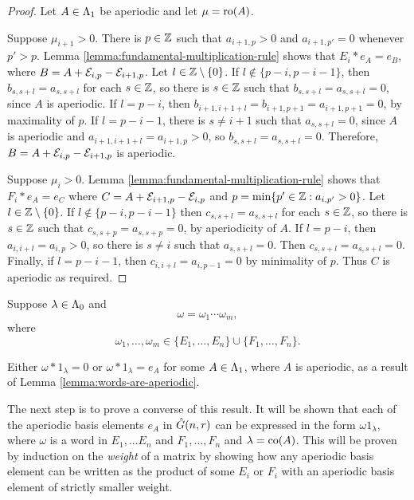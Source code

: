 \documentclass[a4paper, 11pt]{report}
\begin{document}
\begin{proof}
Let $A\in\Lambda_1{}$ be aperiodic and let $\mu=\operatorname{ro}(A)$.

Suppose $\mu_{i+1}>0$. There is $p\in\mathbb{Z}$ such that $a_{i+1,p}>0$ and $a_{i+1,p'}=0$ whenever $p'>p$. Lemma \ref{lemma:fundamental-multiplication-rule} shows that $E_i\ast e_A = e_B$, where $B=A+\mathcal{E}_{i,p}-\mathcal{E}_{i+1,p}$. Let $l\in\mathbb{Z}\setminus\{0\}$. If $l\notin\{p-i,p-i-1\}$, then $b_{s,s+l}=a_{s,s+l}$ for each $s\in\mathbb{Z}$, so there is $s\in\mathbb{Z}$ such that $b_{s,s+l}=a_{s,s+l}=0$, since $A$ is aperiodic. If $l=p-i$, then $b_{i+1,i+1+l} = b_{i+1,p+1}=a_{i+1,p+1}=0$, by maximality of $p$. If $l=p-i-1$, there is $s\neq i+1$ such that $a_{s,s+l}=0$, since $A$ is aperiodic and $a_{i+1,i+1+l}=a_{i+1,p}>0$, so $b_{s,s+l}=a_{s,s+l}=0$. Therefore, $B=A+\mathcal{E}_{i,p}-\mathcal{E}_{i+1,p}$ is aperiodic.

Suppose $\mu_i>0$. Lemma \ref{lemma:fundamental-multiplication-rule} shows that $F_i\ast e_A = e_C$ where $C=A+\mathcal{E}_{i+1,p}-\mathcal{E}_{i,p}$ and $p=\min\{p'\in\mathbb{Z}: a_{i,p'}>0\}$. Let $l\in\mathbb{Z}\setminus\{0\}$. If $l\notin\{p-i,p-i-1\}$ then $c_{s,s+l}=a_{s,s+l}$ for each $s\in\mathbb{Z}$, so there is $s\in\mathbb{Z}$ such that $c_{s,s+p}=a_{s,s+p}=0$, by aperiodicity of $A$. If $l=p-i$, then $a_{i,i+l}=a_{i,p}>0$, so there is $s\neq i$ such that $a_{s,s+l}=0$. Then $c_{s,s+l}=a_{s,s+l}=0$. Finally, if $l=p-i-1$, then $c_{i,i+l}=a_{i,p-1}=0$ by minimality of $p$. Thus $C$ is aperiodic as required.
\end{proof}

Suppose $\lambda\in\Lambda_0{}$ and
\begin{equation*}
\omega = \omega_1\cdots\omega_m,
\end{equation*}
where
\begin{equation*}
\omega_1,\ldots,\omega_m\in\{E_1,\ldots,E_n\}\cup\{F_1,\ldots,F_n\}.
\end{equation*}

Either $\omega\ast 1_\lambda=0$ or $\omega\ast 1_\lambda = e_A$ for some $A\in\Lambda_1{}$, where $A$ is aperiodic, as a result of Lemma \ref{lemma:words-are-aperiodic}.

The next step is to prove a converse of this result. It will be shown that each of the aperiodic basis elements $e_A$ in $\hat{G}(n,r)$ can be expressed in the form $\omega 1_\lambda$, where $\omega$ is a word in $E_1,\ldots E_n$ and $F_1,\ldots, F_n$ and $\lambda=\operatorname{co}(A)$. This will be proven by induction on the \emph{weight} of a matrix by showing how any aperiodic basis element can be written as the product of some $E_i$ or $F_i$ with an aperiodic basis element of strictly smaller weight.
\end{document}
